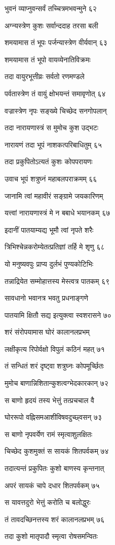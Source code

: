 भुवनं व्याप्नुवन्सर्वं तच्चित्रमभवन्मुने ६२

अग्न्यस्त्रेण कुशः सर्वान्ददाह तरसा बली

शमयामास तं भूपः पर्जन्यास्त्रेण वीर्यवान् ६३

शमयामास तं भूपो वायव्येनातिविक्रमः

तदा वायुरभूत्तीव्रः सर्वतो रणमण्डले

पर्वतास्त्रेण तं वायुं क्षोभयन्तं समावृणोत् ६४

वज्रास्त्रेण नृपः सङ्ख्ये चिच्छेद सनगोपलान्

तदा नारायणास्त्रं स मुमोच कुश उद्भटः

नारायणं तदा भूपं नाशकत्परिबाधितुम् ६५

तदा प्रकुपितोऽत्यतं कुशः कोपपरायणः

उवाच भूपं शत्रुघ्नं महाबलपराक्रमम् ६६

जानामि त्वां महावीरं सङ्ग्रामे जयकारिणम्

यत्त्वां नारायणास्त्रं मे न बबाधे भयानकम् ६७

इदानीं पातयाम्यद्य भूमौ त्वां नृपते शरैः

त्रिभिश्चेन्नकरोम्येतत्प्रतिज्ञां तर्हि मे शृणु ६८

यो मनुष्यवपुः प्राप्य दुर्लभं पुण्यकोटिभिः

तन्नाद्रियेत सम्मोहात्तस्य मेस्त्वत्र पातकम् ६९

सावधानो भवानत्र भवतु प्रधनाङ्गणे

पातयामि क्षितौ सद्य इत्युक्त्वा स्वशरासने ७०

शरं संरोपयामास घोरं कालानलप्रभम्

लक्षीकृत्य रिपोर्वक्षो विपुलं कठिनं महत् ७१

तं सन्धितं शरं दृष्ट्वा शत्रुघ्नः कोपमूर्च्छितः

मुमोच बाणान्निशितान्कुशत्वग्भेदकारकान् ७२

स बाणो हृदयं तस्य भेत्तुं तत्प्रचचाल वै

घोररूपो वह्निसमआशीविषवदुच्छ्वसन् ७३

स बाणो नृपवर्येण रामं स्मृत्वाशुलक्षितः

चिच्छेद कुशमुक्तं स सायकं शितपर्वकम् ७४

तदात्यन्तं प्रकुपितः कुशो बाणस्य कृन्तनात्

अपरं सायकं चापे दधार शितपर्वकम् ७५

स यावत्तदुरो भेत्तुं करोति च बलोद्धुरः

तं तावदच्छिनत्तस्य शरं कालानलप्रभम् ७६

तदा कुशो मातृपादौ स्मृत्वा रोषसमन्वितः

